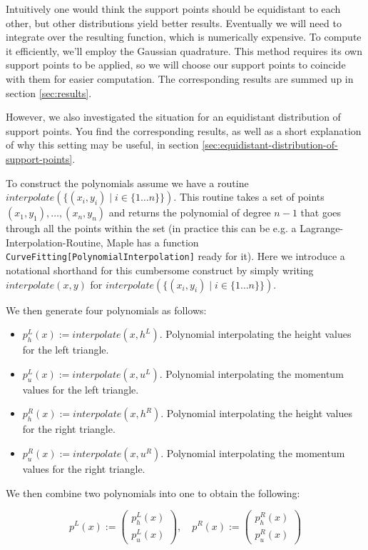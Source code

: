 \documentclass{article}
\begin{document}
Intuitively one would think the support points should be equidistant to each other, but other distributions yield better results. Eventually we will need to integrate over the resulting function, which is numerically expensive. To compute it efficiently, we'll employ the Gaussian quadrature. This method requires its own support points to be applied, so we will choose our support points to coincide with them for easier computation. The corresponding results are summed up in section \ref{sec:results}.

However, we also investigated the situation for an equidistant distribution of support points. You find the corresponding results, as well as a short explanation of why this setting may be useful, in section \ref{sec:equidistant-distribution-of-support-points}.

To construct the polynomials assume we have a routine $interpolate\left(\{\left(x_i,y_i\right) \mid i \in \{1 \dots n\}\}\right)$. This routine takes a set of points $\left(x_1,y_1\right),\dots,\left(x_n,y_n\right)$ and returns the polynomial of degree $n-1$ that goes through all the points within the set (in practice this can be e.g. a Lagrange-Interpolation-Routine, Maple has a function \texttt{CurveFitting[PolynomialInterpolation]} ready for it). Here we introduce a notational shorthand for this cumbersome construct by simply writing $interpolate\left(x,y\right)$ for $interpolate\left(\{\left(x_i,y_i\right) \mid i \in \{1 \dots n\}\}\right)$.

We then generate four polynomials as follows:

\begin{itemize}
\item $p^L_h(x) := interpolate (x,h^L)$. Polynomial interpolating the height values for the left triangle.
\item $p^L_u(x) := interpolate (x,u^L)$. Polynomial interpolating the momentum values for the left triangle.
\item $p^R_h(x) := interpolate (x,h^R)$. Polynomial interpolating the height values for the right triangle.
\item $p^R_u(x) := interpolate (x,u^R)$. Polynomial interpolating the momentum values for the right triangle.
\end{itemize}

We then combine two polynomials into one to obtain the following:

\begin{equation*}
  p^L(x) :=
  \begin{pmatrix}
    p^L_h(x) \\ p^L_u(x)
  \end{pmatrix}, \quad
  p^R(x) :=
  \begin{pmatrix}
    p^R_h(x) \\ p^R_u(x)
  \end{pmatrix}
\end{equation*}
\end{document}
